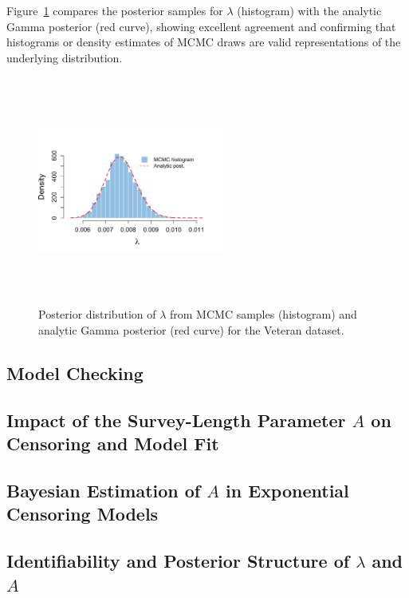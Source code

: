 \begin{example}
Figure~\ref{fig:exp veteran} compares the posterior samples for $\lambda$ (histogram) with the analytic Gamma posterior (red curve), showing excellent agreement and confirming that histograms or density estimates of MCMC draws are valid representations of the underlying distribution.
\begin{figure}[H]
    \centering
    \includegraphics[height=7.5cm, width=0.55\textwidth]{images/veteran_post_lam.png}
    \caption{{\small Posterior distribution of $\lambda$ from MCMC samples (histogram) and analytic Gamma posterior (red curve) for the Veteran dataset.}}
    \label{fig:exp veteran}
\end{figure}
\end{example}









\subsection{Model Checking}\label{sec:model checking}

\subsection{Impact of the Survey-Length Parameter \texorpdfstring{$A$}{A} on Censoring and Model Fit}
\label{Impact of A}

\subsection{Bayesian Estimation of \texorpdfstring{$A$}{A} in Exponential Censoring Models}
\label{A_bayes}

\subsection{Identifiability and Posterior Structure of \texorpdfstring{$\lambda$}{lambda} and \texorpdfstring{$A$}{A}}















